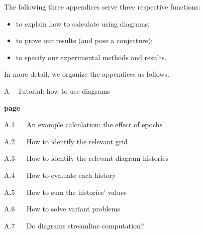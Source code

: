         The following three appendices serve three respective functions:
        \begin{itemize}[noitemsep]
            \item to explain how to calculate using diagrams;
            \item to prove our results (and pose a conjecture);
            \item to specify our experimental methods and results.
        \end{itemize}




        In more detail, we organize the appendices as follows.\\
    
        {\bf
        \par\noindent A ~ Tutorial: how to use diagrams}                        \hfill {\bf page \pageref{appendix:tutorial}}
        \par\indent     A.1 ~~ An example calculation: the effect of epochs     \hfill \pageref{appendix:example}
        \par\indent     A.2 ~~ How to identify the relevant grid                \hfill \pageref{appendix:draw-spacetime} 
        \par\indent     A.3 ~~ How to identify the relevant diagram histories  \hfill \pageref{appendix:draw-histories}
        \par\indent     A.4 ~~ How to evaluate each history                   \hfill \pageref{appendix:evaluate-histories}
        \par\indent     A.5 ~~ How to sum the histories' values                \hfill \pageref{appendix:sum-histories}
        \par\indent     A.6 ~~ How to solve variant problems                    \hfill \pageref{appendix:solve-variants}
        \par\indent     A.7 ~~ Do diagrams streamline computation?              \hfill \pageref{appendix:diagrams-streamline}
    
